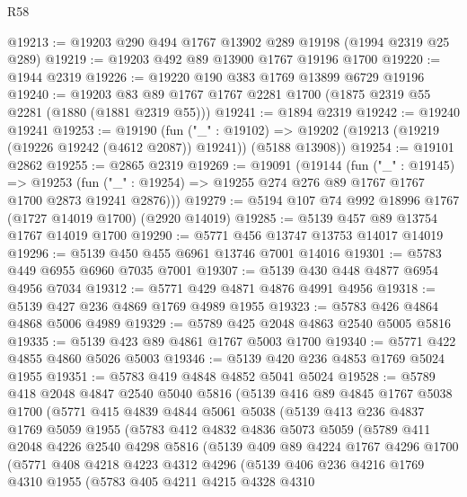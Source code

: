 \begin{lexlean}{R58}
\begin{coremodule}
@19213 := @19203 @290 @494 @1767 @13902 @289 @19198 (@1994 @2319 @25 @289)
@19219 := @19203 @492 @89 @13900 @1767 @19196 @1700
@19220 := @1944 @2319
@19226 := @19220 @190 @383 @1769 @13899 @6729 @19196
@19240 := @19203 @83 @89 @1767 @1767 @2281 @1700 (@1875 @2319 @55 @2281 (@1880 (@1881 @2319 @55)))
@19241 := @1894 @2319
@19242 := @19240 @19241
@19253 := @19190
    (fun ("_" : @19102) =>
    @19202 (@19213 (@19219 (@19226 @19242 (@4612 @2087)) @19241)) (@5188 @13908))
@19254 := @19101 @2862
@19255 := @2865 @2319
@19269 := @19091
    (@19144
      (fun ("_" : @19145) =>
      @19253 (fun ("_" : @19254) => @19255 @274 @276 @89 @1767 @1767 @1700 @2873 @19241 @2876)))
@19279 := @5194 @107 @74 @992 @18996 @1767 (@1727 @14019 @1700) (@2920 @14019)
@19285 := @5139 @457 @89 @13754 @1767 @14019 @1700
@19290 := @5771 @456 @13747 @13753 @14017 @14019
@19296 := @5139 @450 @455 @6961 @13746 @7001 @14016
@19301 := @5783 @449 @6955 @6960 @7035 @7001
@19307 := @5139 @430 @448 @4877 @6954 @4956 @7034
@19312 := @5771 @429 @4871 @4876 @4991 @4956
@19318 := @5139 @427 @236 @4869 @1769 @4989 @1955
@19323 := @5783 @426 @4864 @4868 @5006 @4989
@19329 := @5789 @425 @2048 @4863 @2540 @5005 @5816
@19335 := @5139 @423 @89 @4861 @1767 @5003 @1700
@19340 := @5771 @422 @4855 @4860 @5026 @5003
@19346 := @5139 @420 @236 @4853 @1769 @5024 @1955
@19351 := @5783 @419 @4848 @4852 @5041 @5024
@19528 := @5789
    @418
    @2048
    @4847
    @2540
    @5040
    @5816
    (@5139
      @416
      @89
      @4845
      @1767
      @5038
      @1700
      (@5771
        @415
        @4839
        @4844
        @5061
        @5038
        (@5139
          @413
          @236
          @4837
          @1769
          @5059
          @1955
          (@5783
            @412
            @4832
            @4836
            @5073
            @5059
            (@5789
              @411
              @2048
              @4226
              @2540
              @4298
              @5816
              (@5139
                @409
                @89
                @4224
                @1767
                @4296
                @1700
                (@5771
                  @408
                  @4218
                  @4223
                  @4312
                  @4296
                  (@5139
                    @406
                    @236
                    @4216
                    @1769
                    @4310
                    @1955
                    (@5783
                      @405
                      @4211
                      @4215
                      @4328
                      @4310

\end{coremodule}
\end{lexlean}
